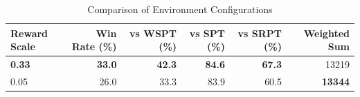 \begin{table}[htbp]%
\centering%
\begin{tabular}{lrrrrr}%
\toprule%
\textbf{Reward Scale}&\textbf{Win Rate (\%)}&\textbf{vs WSPT (\%)}&\textbf{vs SPT (\%)}&\textbf{vs SRPT (\%)}&\textbf{Weighted Sum}\\%
\midrule%
\textbf{0.33}&\textbf{33.0}&\textbf{42.3}&\textbf{84.6}&\textbf{67.3}&13219\\%
0.05&26.0&33.3&83.9&60.5&\textbf{13344}\\%
\bottomrule%
\end{tabular}%
\caption{Comparison of Environment Configurations}%
\label{tab:environment}%
\end{table}